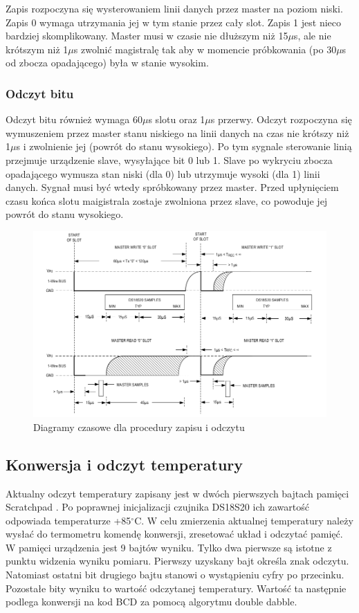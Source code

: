 \documentclass[a4paper]{article}
\begin{document}
Zapis rozpoczyna się wysterowaniem linii danych przez master na poziom niski. Zapis 0 wymaga utrzymania jej w tym stanie przez cały slot. Zapis 1 jest nieco bardziej skomplikowany. Master musi w czasie nie dłuższym niż 15$\mu$s, ale nie krótszym niż 1$\mu$s zwolnić magistralę tak aby w momencie próbkowania (po 30$\mu$s od zbocza opadającego) była w stanie wysokim. 

\subsubsection{Odczyt bitu}
Odczyt bitu również wymaga 60$\mu$s slotu oraz 1$\mu$s przerwy. Odczyt rozpoczyna się wymuszeniem przez master stanu niskiego na linii danych na czas nie krótszy niż 1$\mu$s i zwolnienie jej (powrót do stanu wysokiego). Po tym sygnale sterowanie linią przejmuje urządzenie slave, wysyłające bit 0 lub 1. Slave po wykryciu zbocza opadającego wymusza stan niski (dla 0) lub utrzymuje  wysoki (dla 1) linii danych. Sygnał musi być wtedy spróbkowany przez master. Przed upłynięciem czasu końca slotu maigistrala zostaje zwolniona przez slave, co powoduje jej powrót do stanu wysokiego.

\begin{figure}[H]
\begin{center}
\includegraphics[width=14cm]{graphics/slots.png}
\end{center}
\caption{Diagramy czasowe dla procedury zapisu i odczytu}
\label{slotsitming}
\end{figure}

\subsection{Konwersja i odczyt temperatury}
Aktualny odczyt temperatury zapisany jest w dwóch pierwszych bajtach pamięci Scratchpad \cite{bib_ds18s20}. Po poprawnej inicjalizacji czujnika DS18S20 ich zawartość odpowiada temperaturze +85$^\circ$C. W celu zmierzenia aktualnej temperatury należy wysłać do termometru komendę konwersji, zresetować układ i odczytać pamięć. W pamięci urządzenia jest 9 bajtów wyniku. Tylko dwa pierwsze są istotne z punktu widzenia wyniku pomiaru. Pierwszy uzyskany bajt określa znak odczytu. Natomiast ostatni bit drugiego bajtu stanowi o wystąpieniu cyfry po przecinku. Pozostałe bity wyniku to wartość odczytanej temperatury.  Wartość ta następnie podlega konwersji na kod BCD za pomocą  algorytmu double dabble.
\end{document}

